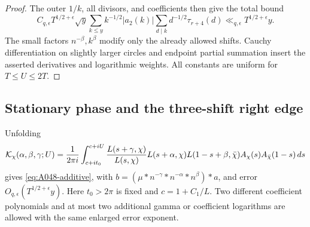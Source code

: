 \begin{proof}
The outer \(1/k\), all divisors, and coefficients
then give the total bound
\[
 C_{q,\epsilon}T^{1/2+\epsilon}\sqrt y
       \sum_{k\le y}k^{-1/2}|a_2(k)|
              \sum_{d\mid k}d^{-1/2}\tau_{r+4}(d)
            \ll_{q,\epsilon}T^{1/2+\epsilon}y.
\]
The small factors \(n^{-\beta},k^\beta\) modify only
the already allowed shifts. Cauchy differentiation
on slightly larger circles and endpoint partial
summation insert the asserted derivatives and
logarithmic weights. All constants are uniform for
\(T\le U\le2T\).
\end{proof}

\subsection*{Stationary phase and the three-shift right edge}

\begin{lemma}
\label{lem:A048-stationary}
Unfolding
\begin{align}
 {\cal K}_\chi(\alpha,\beta,\gamma;U)
 =\frac1{2\pi i}\int_{c+it_0}^{c+iU}
   \frac{L(s+\gamma,\chi)}{L(s,\chi)}
       L(s+\alpha,\chi)L(1-s+\beta,\bar\chi)
       A_\chi(s)A_{\bar\chi}(1-s)\,ds
 \label{eq:A048-K}
\end{align}
gives \eqref{eq:A048-additive}, with
\(b=(\mu*n^{-\gamma}*n^{-\alpha}*n^\beta)*a\),
and error \(O_{q,\epsilon}(T^{1/2+\epsilon}y)\).
Here \(t_0>2\pi\) is fixed and \(c=1+C_1/L\).
Two different coefficient polynomials and at most
two additional gamma or coefficient logarithms are
allowed with the same enlarged error exponent.
\end{lemma}

